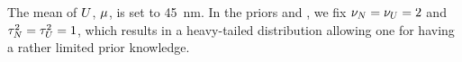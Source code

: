 The mean of $U$, $\fMean$, is set to 45~nm. In the priors  and , we fix $\nu_N = \nu_U = 2$ and $\tau^2_N = \tau^2_U = 1$, which results in a heavy-tailed distribution allowing one for having a rather limited prior knowledge.
